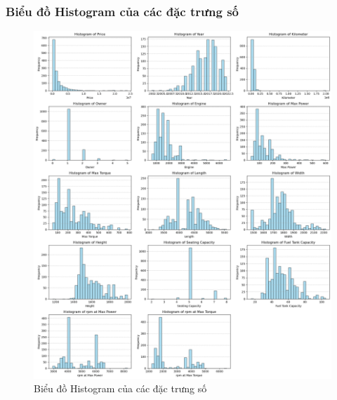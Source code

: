 \subsubsection{Biểu đồ Histogram của các đặc trưng số}
\begin{figure}[H]
    \centering
    \includegraphics[width=1\linewidth]{img/histogram-1.png}
    \caption{Biểu đồ Histogram của các đặc trưng số}
    \label{fig:histogram-1}
\end{figure}

